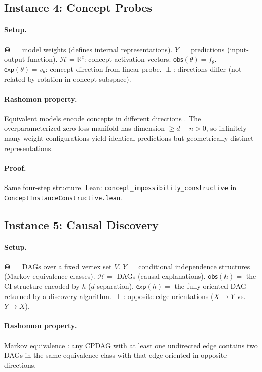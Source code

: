 \documentclass[11pt,a4paper]{article}
\newcommand{\R}{\mathbb{R}}
\newcommand{\Params}{\mathbf{\Theta}}
\newcommand{\sH}{\mathcal{H}}
\newcommand{\incomp}{\perp}
\begin{document}
\subsection{Instance 4: Concept Probes}
\label{app:proof-concept}

\paragraph{Setup.}
$\Params ={}$ model weights (defines internal representations).
$Y ={}$ predictions (input-output function).
$\sH = \R^c$: concept activation vectors.
$\mathsf{obs}(\theta) = f_\theta$.
$\mathsf{exp}(\theta) = v_\theta$: concept direction from linear probe.
$\incomp$: directions differ (not related by rotation in concept subspace).

\paragraph{Rashomon property.}
Equivalent models encode concepts in different directions
\citep{bolukbasi2016man,kim2018tcav,ravfogel2020null}.  The
overparameterized zero-loss manifold has dimension $\geq d - n > 0$,
so infinitely many weight configurations yield identical predictions
but geometrically distinct representations.

\paragraph{Proof.}
Same four-step structure.  Lean:
\texttt{concept\_impossibility\_constructive} in \texttt{ConceptInstanceConstructive.lean}.

\subsection{Instance 5: Causal Discovery}
\label{app:proof-causal}

\paragraph{Setup.}
$\Params ={}$ DAGs over a fixed vertex set $V$.
$Y ={}$ conditional independence structures (Markov equivalence classes).
$\sH ={}$ DAGs (causal explanations).
$\mathsf{obs}(h) ={}$ the CI structure encoded by $h$ ($d$-separation).
$\mathsf{exp}(h) ={}$ the fully oriented DAG returned by a discovery algorithm.
$\incomp$: opposite edge orientations ($X \to Y$ vs.\ $Y \to X$).

\paragraph{Rashomon property.}
Markov equivalence \citep{verma1991equivalence}: any CPDAG with at least one
undirected edge contains two DAGs in the same equivalence class with that edge
oriented in opposite directions.
\end{document}
